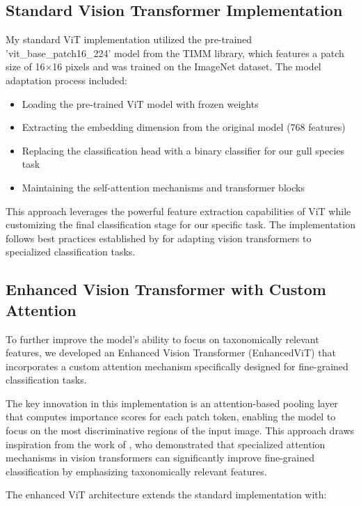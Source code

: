 \documentclass[a4paper,12pt]{article}
\begin{document}
\subsection{Standard Vision Transformer Implementation}

My standard ViT implementation utilized the pre-trained 'vit\_base\_patch16\_224' model from the TIMM library, which features a patch size of 16$\times$16 pixels and was trained on the ImageNet dataset. The model adaptation process included:

\begin{itemize}
    \item Loading the pre-trained ViT model with frozen weights
    \item Extracting the embedding dimension from the original model (768 features)
    \item Replacing the classification head with a binary classifier for our gull species task
    \item Maintaining the self-attention mechanisms and transformer blocks
\end{itemize}

This approach leverages the powerful feature extraction capabilities of ViT while customizing the final classification stage for our specific task. The implementation follows best practices established by \citep{wightman2021resnet} for adapting vision transformers to specialized classification tasks.

\subsection{Enhanced Vision Transformer with Custom Attention}

To further improve the model's ability to focus on taxonomically relevant features, we developed an Enhanced Vision Transformer (EnhancedViT) that incorporates a custom attention mechanism specifically designed for fine-grained classification tasks.

The key innovation in this implementation is an attention-based pooling layer that computes importance scores for each patch token, enabling the model to focus on the most discriminative regions of the input image. This approach draws inspiration from the work of \citep{guan2022attention}, who demonstrated that specialized attention mechanisms in vision transformers can significantly improve fine-grained classification by emphasizing taxonomically relevant features.

The enhanced ViT architecture extends the standard implementation with:
\end{document}
